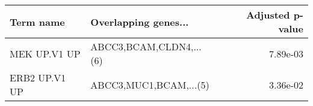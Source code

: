 \begin{tabular}{llr}
\toprule
    Term name &    Overlapping genes... &  Adjusted p-value \\
\midrule
 MEK UP.V1 UP & ABCC3,BCAM,CLDN4,...(6) &          7.89e-03 \\
ERB2 UP.V1 UP &  ABCC3,MUC1,BCAM,...(5) &          3.36e-02 \\
\bottomrule
\end{tabular}
